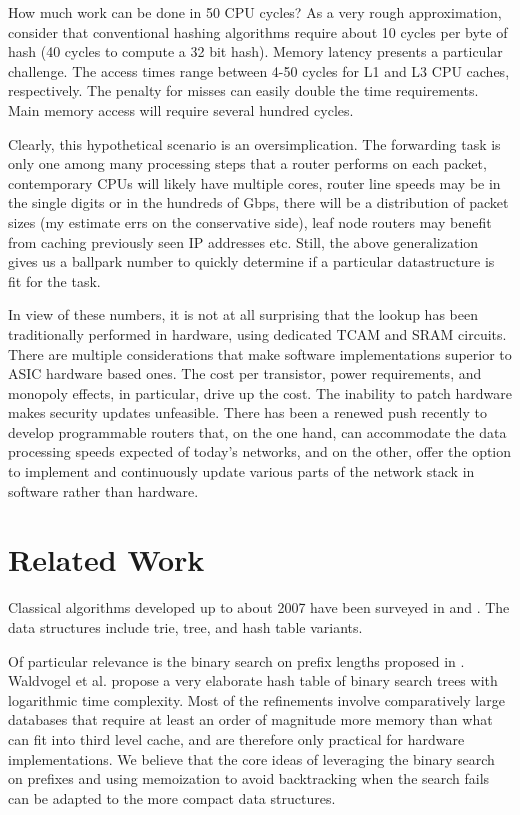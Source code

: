 \documentclass[conference,compsoc]{IEEEtran}
\begin{document}
How much work can be done in 50 CPU cycles? As a very rough approximation,
consider that conventional hashing algorithms require about 10 cycles 
per byte of hash (40 cycles to compute a 32 bit hash). Memory latency
presents a particular challenge. The access times range between 4-50 cycles
for L1 and L3 CPU caches, respectively. The penalty for misses can easily 
double the time requirements. Main memory access will require several hundred 
cycles.

Clearly, this hypothetical scenario is an oversimplication. The forwarding
task is only one among many processing steps that a router performs on each
packet, contemporary CPUs will likely have multiple cores, router line
speeds may be in the single digits or in the hundreds of Gbps, there will 
be a distribution of packet sizes (my estimate errs on the conservative
side), leaf node routers may benefit from caching previously seen IP
addresses etc. Still, the above generalization gives us a ballpark number 
to quickly determine if a particular datastructure is fit for the task.

In view of these numbers, it is not at all surprising that the lookup has 
been traditionally performed in hardware, using dedicated TCAM and SRAM 
circuits. There are multiple considerations that make software 
implementations superior to ASIC hardware based ones. The cost per 
transistor, power requirements, and monopoly effects, in particular, 
drive up the cost. The inability to patch hardware makes security updates
unfeasible. There has been a renewed push recently to develop 
programmable routers that, on the one hand, can accommodate the data 
processing speeds expected of today's networks, and on the other, offer 
the option to implement and continuously update various parts of the 
network stack in software rather than hardware.


\section{Related Work}
Classical algorithms developed up to about 2007 have been surveyed in
\cite{Sanchez:Survey} and \cite{Varghese:Algorithmics}. 
The data structures include trie, tree, and hash table variants.

Of particular relevance is the binary search on prefix lengths
proposed in \cite{Waldvogel:Scalable}. Waldvogel et al. propose a very 
elaborate hash table of binary search trees with logarithmic time 
complexity. Most
of the refinements involve comparatively large databases that require at
least an order of magnitude more memory than what can fit into third level
cache, and are therefore only practical for hardware implementations. We
believe that the core ideas of leveraging the binary search on prefixes and 
using memoization to avoid backtracking when the search fails can be
adapted to the more compact data structures.
\end{document}
